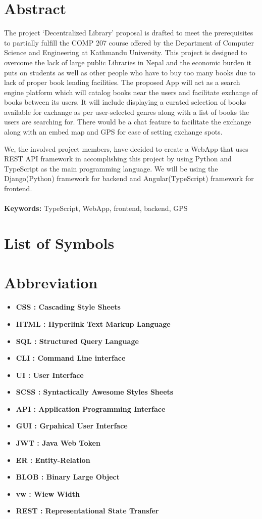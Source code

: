 \documentclass[12pt]{article}
\begin{document}
\clearpage

\section{Abstract}
The project ‘Decentralized Library’ proposal is drafted to meet the prerequisites 
to partially fulfill the COMP 207 course offered by the Department of Computer 
Science and Engineering at Kathmandu University. This project is designed to 
overcome the lack  of large public Libraries in Nepal and the economic burden 
it puts on students as well as other people who have to buy too many books due to 
lack of proper book lending facilities. The proposed App will act as a search 
engine platform which will catalog books near the users and facilitate exchange of 
books between its users. It will include displaying a curated selection of books 
available for exchange as per user-selected genres along with a list of books the 
users are searching for. There would be a chat feature to facilitate the exchange 
along with an embed map and GPS for ease of setting exchange spots.

We, the involved project members, have decided to create a WebApp that uses 
REST API framework in accomplishing this project by using Python and TypeScript 
as the main programming language. We will be using the Django(Python) framework 
for backend and Angular(TypeScript) framework for frontend.
\\\\
\textbf{Keywords:} TypeScript, WebApp, frontend, backend, GPS

\clearpage
\section{List of Symbols}

\clearpage
\section{Abbreviation}
\begin{itemize}
    \item \textbf{CSS : Cascading Style Sheets}
    \item \textbf{HTML : Hyperlink Text Markup Language}
    \item \textbf{SQL : Structured Query Language}
    \item \textbf{CLI : Command Line interface}
    \item \textbf{UI : User Interface}
    \item \textbf{SCSS : Syntactically Awesome Styles Sheets}
    \item \textbf{API : Application Programming Interface}
    \item \textbf{GUI : Grpahical User Interface}
    \item \textbf{JWT : Java Web Token}
    \item \textbf{ER : Entity-Relation}
    \item \textbf{BLOB : Binary Large Object}
    \item \textbf{vw : Wiew Width}
    \item \textbf{REST : Representational State Transfer}
\end{itemize}
\end{document}
